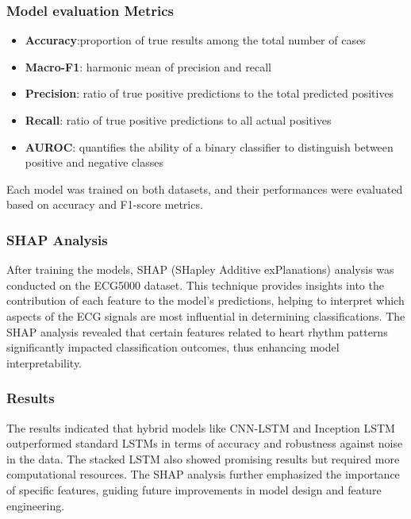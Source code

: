 \documentclass[nonacm,sigconf]{acmart}
\begin{document}
\subsubsection{\textbf{Model evaluation Metrics}}
\begin{itemize}
    \item \textbf{Accuracy}:proportion of true results among the total number of cases 
    \item \textbf{Macro-F1}: harmonic mean of precision and recall
    \item \textbf{Precision}: ratio of true positive predictions to the total predicted positives
    \item \textbf{Recall}: ratio of true positive predictions to all actual positives
    \item \textbf{AUROC}: quantifies the ability of a binary classifier to distinguish between positive and negative classes
\end{itemize}

Each model was trained on both datasets, and their performances were evaluated based on accuracy and F1-score metrics.
\subsubsection{\textbf{SHAP Analysis}}
After training the models, SHAP (SHapley Additive exPlanations) analysis was conducted on the ECG5000 dataset. This technique provides insights into the contribution of each feature to the model's predictions, helping to interpret which aspects of the ECG signals are most influential in determining classifications. The SHAP analysis revealed that certain features related to heart rhythm patterns significantly impacted classification outcomes, thus enhancing model interpretability.

\subsubsection{\textbf{Results}}
The results indicated that hybrid models like CNN-LSTM and Inception LSTM outperformed standard LSTMs in terms of accuracy and robustness against noise in the data. The stacked LSTM also showed promising results but required more computational resources. The SHAP analysis further emphasized the importance of specific features, guiding future improvements in model design and feature engineering.
\end{document}
